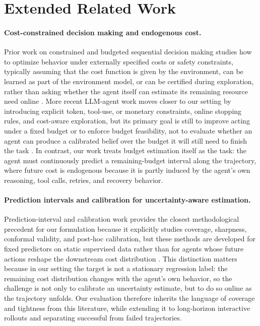
\section{Extended Related Work}
\label{sec:extended-related-work}

\paragraph{Cost-constrained decision making and endogenous cost.}
Prior work on constrained and budgeted sequential decision making studies how to optimize behavior under externally specified costs or safety constraints, typically assuming that the cost function is given by the environment, can be learned as part of the environment model, or can be certified during exploration, rather than asking whether the agent itself can estimate its remaining resource need online \cite{achiam2017constrained,tessler2019reward,carrara2019budgeted,wachi2020safe,zheng2020constrained,liu2022constrainedvariational,li2023nearoptimal,mazumdar2024safe}. More recent LLM-agent work moves closer to our setting by introducing explicit token, tool-use, or monetary constraints, online stopping rules, and cost-aware exploration, but its primary goal is still to improve acting under a fixed budget or to enforce budget feasibility, not to evaluate whether an agent can produce a calibrated belief over the budget it will still need to finish the task \cite{zhou2026adaptive,liu2026budgetconstrained,ding2026calibratethenact,mccleary2026quantifying}. In contrast, our work treats budget estimation itself as the task: the agent must continuously predict a remaining-budget interval along the trajectory, where future cost is endogenous because it is partly induced by the agent's own reasoning, tool calls, retries, and recovery behavior.

\paragraph{Prediction intervals and calibration for uncertainty-aware estimation.}
Prediction-interval and calibration work provides the closest methodological precedent for our formulation because it explicitly studies coverage, sharpness, conformal validity, and post-hoc calibration, but these methods are developed for fixed predictors on static supervised data rather than for agents whose future actions reshape the downstream cost distribution \cite{lei2018distributionfree,pearce2018highquality,kuleshov2018accurate,romano2019conformalized,amini2020deep,chung2021beyond,levi2022evaluating}. This distinction matters because in our setting the target is not a stationary regression label: the remaining cost distribution changes with the agent's own behavior, so the challenge is not only to calibrate an uncertainty estimate, but to do so online as the trajectory unfolds. Our evaluation therefore inherits the language of coverage and tightness from this literature, while extending it to long-horizon interactive rollouts and separating successful from failed trajectories.

